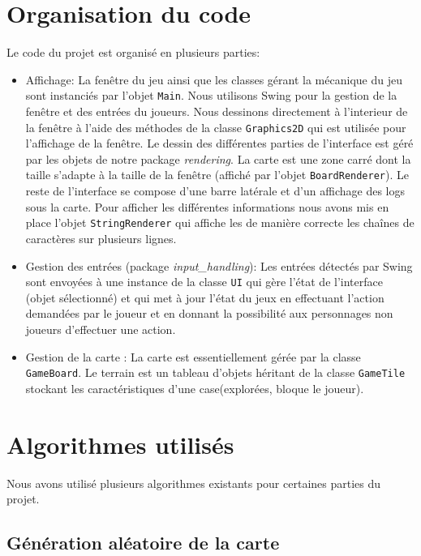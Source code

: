 \documentclass[10pt,a4paper]{article}
\begin{document}
\section{Organisation du code}
Le code du projet est organisé en plusieurs parties:
\begin{itemize}
	\item Affichage: La fenêtre du jeu ainsi que les classes gérant la mécanique du jeu sont instanciés par l'objet \texttt{Main}. Nous utilisons Swing pour la gestion de la fenêtre et des entrées du joueurs. Nous dessinons directement à l'interieur de la fenêtre à l'aide des méthodes de la classe \texttt{Graphics2D} qui est utilisée pour l'affichage de la fenêtre. Le dessin des différentes parties de l'interface est géré par les objets de notre package \emph{rendering}. La carte est une zone carré dont la taille s'adapte à la taille de la fenêtre (affiché par l'objet \texttt{BoardRenderer}). Le reste de l'interface se compose d'une barre latérale et d'un affichage des logs sous la carte. Pour afficher les différentes informations nous avons mis en place l'objet \texttt{StringRenderer} qui affiche les de manière correcte les chaînes de caractères sur plusieurs lignes.
	\item Gestion des entrées (package \emph{input\_handling}): Les entrées détectés par Swing sont envoyées à une instance de la classe \texttt{UI} qui gère l'état de l'interface (objet sélectionné) et qui met à jour l'état du jeux en effectuant l'action demandées par le joueur et en donnant la possibilité aux personnages non joueurs d'effectuer une action.
	\item Gestion de la carte : La carte est essentiellement gérée par la classe \texttt{GameBoard}. Le terrain est un tableau d'objets héritant de la classe \texttt{GameTile} stockant les caractéristiques d'une case(explorées, bloque le joueur).
\end{itemize}

\section{Algorithmes utilisés}

Nous avons utilisé plusieurs algorithmes existants pour certaines parties du projet.

\subsection{Génération aléatoire de la carte}
\end{document}
